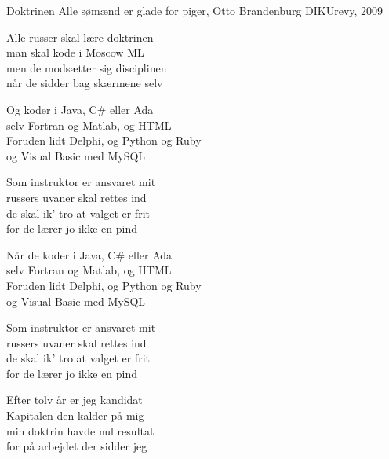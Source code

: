 \begin{song}{Doktrinen}
  {} %
  {Alle sømænd er glade for piger, Otto Brandenburg} %
  {} %
  {DIKUrevy, 2009} %
  {\NotCCLIed} %

  \begin{SBVerse}
    Alle russer skal lære doktrinen\\
    man skal kode i Moscow ML\\
    men de modsætter sig disciplinen\\
    når de sidder bag skærmene selv
  \end{SBVerse}

  \begin{SBChorus}
    Og koder i Java, C\# eller Ada\\
    selv Fortran og Matlab, og HTML\\
    Foruden lidt Delphi, og Python og Ruby\\
    og Visual Basic med MySQL
  \end{SBChorus}

  \begin{SBVerse}
    Som instruktor er ansvaret mit\\
    russers uvaner skal rettes ind\\
    de skal ik' tro at valget er frit\\
    for de lærer jo ikke en pind
  \end{SBVerse}

  \begin{SBChorus}
    Når de koder i Java, C\# eller Ada\\
    selv Fortran og Matlab, og HTML\\
    Foruden lidt Delphi, og Python og Ruby\\
    og Visual Basic med MySQL
  \end{SBChorus}

  \begin{SBVerse}
    Som instruktor er ansvaret mit\\
    russers uvaner skal rettes ind\\
    de skal ik' tro at valget er frit\\
    for de lærer jo ikke en pind
  \end{SBVerse}

  \begin{SBChorus}
    Efter tolv år er jeg kandidat\\
    Kapitalen den kalder på mig\\
    min doktrin havde nul resultat\\
    for på arbejdet der sidder jeg
  \end{SBChorus}
\end{song}